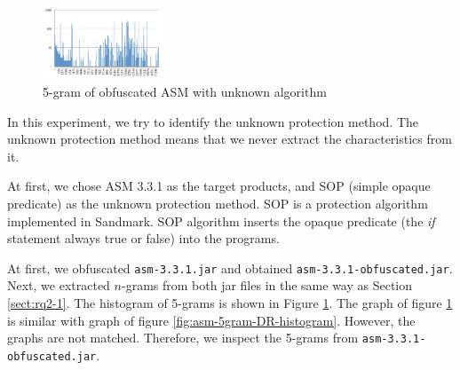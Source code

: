 \documentclass[conference]{IEEEtran}
\begin{document}

\begin{figure}[b]
  \centering
  \includegraphics[clip,width=0.32\textwidth]{images/SOP_ASM}
  \caption{5-gram of obfuscated ASM with unknown algorithm}
  \label{fig:SOP}
\end{figure}



In this experiment, we try to identify the unknown protection method.
The unknown protection method means that we never extract the
characteristics from it.

At first, we chose ASM 3.3.1 as the target products, and SOP (simple
opaque predicate) as the unknown protection method.  SOP is a
protection algorithm implemented in Sandmark.  SOP algorithm inserts
the opaque predicate (the \emph{if} statement always true or false)
into the programs.

At first, we obfuscated \texttt{asm-3.3.1.jar} and obtained
\texttt{asm-3.3.1-obfuscated.jar}.
%
Next, we extracted $n$-grams from both jar files in the same way as
Section \ref{sect:rq2-1}.  The histogram of 5-grams is shown in Figure
\ref{fig:SOP}.  The graph of figure \ref{fig:SOP} is similar with
graph of figure \ref{fig:asm-5gram-DR-histogram}.  However, the graphs
are not matched.  Therefore, we inspect the 5-grams from
\texttt{asm-3.3.1-obfuscated.jar}.
\end{document}
